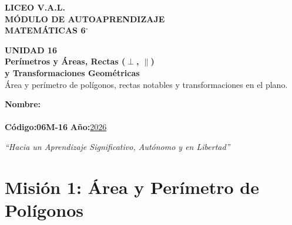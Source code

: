 \documentclass[12pt, letterpaper]{article}
\begin{document}

	\begin{center}
		{\Huge\textbf{LICEO V.A.L.}}\\[0.5cm]
		{\LARGE\textbf{MÓDULO DE AUTOAPRENDIZAJE}}\\[0.5cm]
		{\Large\textbf{MATEMÁTICAS 6$^\circ$}}\\[0.5cm]
		\begin{tcolorbox}[colback=valblue!10, colframe=valblue,
			arc=3mm, boxrule=1.5pt]
			\centering
			\Huge\textbf{UNIDAD 16}\\[0.25cm]
			\Large\textbf{Perímetros y Áreas, Rectas ($\perp$, $\parallel$)}\\[0.1cm]
			\Large\textbf{y Transformaciones Geométricas}\\[0.2cm]
			\large Área y perímetro de polígonos, rectas notables y transformaciones en el plano.
		\end{tcolorbox}
		\vspace{0.6cm}
		\begin{tcolorbox}[colback=white, colframe=valblue,
			width=12cm, arc=3mm, boxrule=1.5pt]
			\centering\vspace{0.3cm}
			\textbf{Nombre:}\\[0.3cm]
			\underline{\hspace{9cm}}\\[0.5cm]
			\textbf{Código:}\;\textbf{06M-16}
			\hspace{1cm}\textbf{Año:}\;\underline{2026}
			\vspace{0.3cm}
		\end{tcolorbox}
		\vspace{0.8cm}
		\textit{``Hacia un Aprendizaje Significativo, Autónomo y en Libertad''}
	\end{center}

	\section*{Misión 1: Área y Perímetro de Polígonos}
\end{document}
